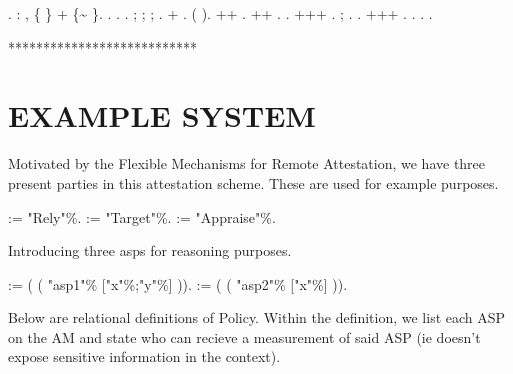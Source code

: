 \documentclass[12pt]{report}
\begin{document}
\begin{coqdoccode}
\coqdocindent{2.00em}
.\coqdoceol
\coqdocemptyline
\coqdocnoindent
{}  : \coqdockw{\ensuremath{\forall}}   , \{   \} + \{\~{}   \}.\coqdoceol
\coqdocnoindent
{}.\coqdoceol
\coqdocnoindent
{}.   .  ; ;  ;   .\coqdoceol
\coqdocnoindent
+ .  (  ).\coqdoceol
\coqdocnoindent
++ .\coqdoceol
\coqdocnoindent
++      .  .\coqdoceol
\coqdocnoindent
+++ .  ; . .\coqdoceol
\coqdocnoindent
+++ . . .\coqdoceol
\coqdocnoindent
{}.\coqdoceol
\coqdocemptyline
\end{coqdoccode}
***************************
\section{EXAMPLE SYSTEM}




 Motivated by the Flexible Mechanisms for Remote Attestation, 
we have three present parties in this attestation scheme. 
These are used for example purposes. 
\begin{coqdoccode}
\coqdocemptyline
\coqdocnoindent
{}  := "Rely"\%.\coqdoceol
\coqdocnoindent
{}  := "Target"\%.\coqdoceol
\coqdocnoindent
{}  := "Appraise"\%.\coqdoceol
\coqdocemptyline
\end{coqdoccode}
Introducing three asps for reasoning purposes. 
\begin{coqdoccode}
\coqdocnoindent
{}  :=\coqdoceol
\coqdocindent{1.00em}
(   ( "asp1"\% ["x"\%;"y"\%]  )).\coqdoceol
\coqdocnoindent
{}  :=\coqdoceol
\coqdocindent{1.00em}
(   ( "asp2"\% ["x"\%]  )).\coqdoceol
\coqdocemptyline
\end{coqdoccode}
Below are relational definitions of Policy. Within the definition, we list each ASP on the AM and state who can recieve a measurement of said ASP (ie doesn't expose sensitive information in the context). 
\end{document}
